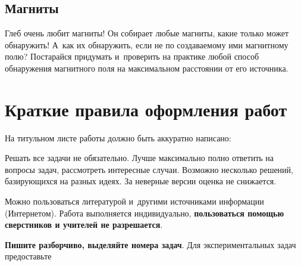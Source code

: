\documentclass[a4paper,12pt]{article}
\begin{document}
\subsection{Магниты}
Глеб очень любит магниты! Он собирает любые магниты, какие только может обнаружить!
А~как их обнаружить, если не по создаваемому ими магнитному полю? Постарайся придумать
и~проверить на практике любой способ обнаружения магнитного поля
на максимальном расстоянии от его источника.


\section*{Краткие правила оформления работ}
\footnotesize
На титульном листе работы должно быть аккуратно написано:

Решать все задачи не обязательно. Лучше максимально полно ответить на вопросы задач,
рассмотреть интересные случаи. Возможно несколько решений, базирующихся
на разных идеях. За неверные версии оценка не снижается.

Можно пользоваться литературой и~другими источниками информации (Интернетом).
Работа выполняется индивидуально, \textbf{пользоваться помощью сверстников и учителей не разрешается}.

\textbf{Пишите разборчиво, выделяйте номера задач}.
Для экспериментальных задач предоставьте
\end{document}
